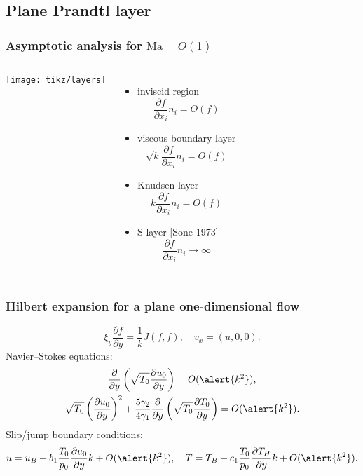 \documentclass[mathserif]{beamer} %
\newcommand{\Ma}{\mathrm{Ma}}
\newcommand{\pder}[2][]{\frac{\partial#1}{\partial#2}}
\newcommand{\OO}[1]{O(#1)}
\begin{document}
\subsection{Plane Prandtl layer}

\begin{frame}
    \frametitle{Asymptotic analysis for \(\Ma = \OO{1}\)}
   	\begin{columns}
		\begin{center}
		    \vspace{-27pt}
			\texttt{[image: tikz/layers]}
		\end{center}
		\vspace{-10pt}
		\begin{itemize}
			\item inviscid region  \[ \pder[f]{x_i}n_i = \OO{f} \]
			\item viscous boundary layer \[ \sqrt{k}\pder[f]{x_i}n_i = \OO{f} \]
			\item Knudsen layer \[ k\pder[f]{x_i}n_i = \OO{f} \]
			\item S-layer [Sone 1973] \[ \pder[f]{x_i}n_i \to \infty \]
		\end{itemize}
	\end{columns}
\end{frame}

\begin{frame}
    \frametitle{Hilbert expansion for a plane one-dimensional flow}
    \begin{equation}\label{eq:Hilbert_plane_1d}
        \xi_y\pder[f]{y} = \frac1k J(f,f), \quad v_x = (u, 0, 0).
    \end{equation}
    \pause
    Navier--Stokes equations:
    \begin{gather}
        \pder{y}\left( \sqrt{T_0}\pder[u_0]{y} \right) = \OO{\alert{k^2}}, \\
        \sqrt{T_0}\left( \pder[u_0]{y}\right)^2 + \frac{5\gamma_2}
            {4\gamma_1}\pder{y}\left(\sqrt{T_0}\pder[T_0]{y} \right) = \OO{\alert{k^2}}.
    \end{gather}
    Slip/jump boundary conditions:
    \begin{equation}
        u = u_B + b_1\frac{T_0}{p_0} \pder[u_0]{y}k + \OO{\alert{k^2}}, \quad
        T = T_B + c_1\frac{T_0}{p_0}\pder[T_H]{y}k + \OO{\alert{k^2}}.
    \end{equation}
\end{frame}
\end{document}
